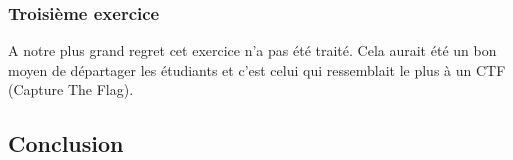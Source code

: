 \documentclass[12pt]{article}
\begin{document}
\subsubsection{Troisième exercice}
A notre plus grand regret cet exercice n'a pas été traité. Cela aurait été un bon moyen de départager les étudiants et c'est celui qui ressemblait le plus à un CTF (Capture The Flag).
\subsection{Conclusion}
\end{document}
